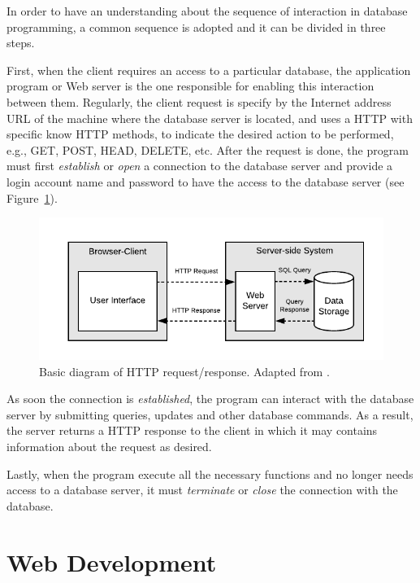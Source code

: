 In order to have an understanding about the sequence of interaction in database programming, a common sequence is adopted and it can be divided in three steps.

First, when the client requires an access to a particular database, the application program or Web server is the one responsible for enabling this interaction between them. Regularly, the client request is specify by the Internet address \gls{URL} of the machine where the database server is located, and uses a \gls{HTTP} with specific know \gls{HTTP} methods, to indicate the desired action to be performed, e.g., GET, POST, HEAD, DELETE, etc. After the request is done, the program must first \textit{establish} or \textit{open} a connection to the database server and provide a login account name and password to have the access to the database server (see Figure~\ref{fig:httpRequest}). 

\begin{figure}[h!]
    \centering
    \includegraphics[scale=1]{images/study_of_tools/database/HTTPrequest.pdf}
    \caption{Basic diagram of HTTP request/response. Adapted from \cite{ELMASRI:2015}.}
    \label{fig:httpRequest}
\end{figure}

As soon the connection is \textit{established}, the program can interact with the database server by submitting queries, updates and other database commands. As a result, the server returns a \gls{HTTP} response to the client in which it may contains information about the request as desired.

Lastly, when the program execute all the necessary functions and no longer needs access to a database server, it must \textit{terminate} or \textit{close} the connection with the database.


\section{Web Development}\label{webDevelopment}

